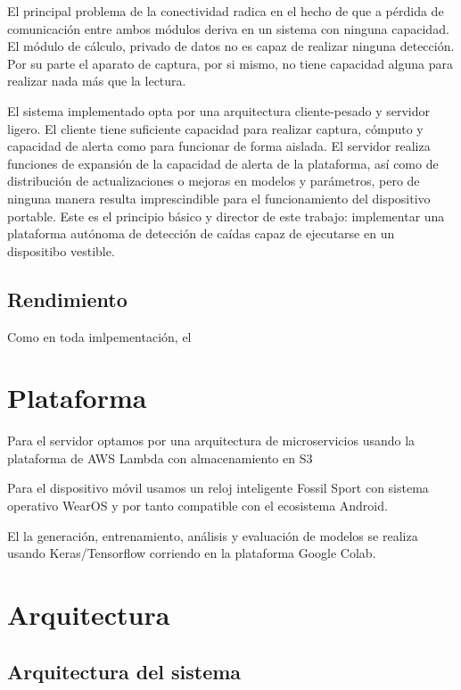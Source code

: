 El principal problema de la conectividad radica en el hecho de que a pérdida de comunicación entre ambos módulos deriva en un sistema con ninguna capacidad. El módulo de cálculo, privado de datos no es capaz de realizar ninguna detección. Por su parte el aparato de captura, por si mismo, no tiene capacidad alguna para realizar nada más que la lectura.

El sistema implementado opta por una arquitectura cliente-pesado y servidor ligero. El cliente tiene suficiente capacidad para realizar captura, cómputo y capacidad de alerta como para funcionar de forma aislada. El servidor realiza funciones de expansión de la capacidad de alerta de la plataforma, así como de distribución de actualizaciones o mejoras en modelos y parámetros, pero de ninguna manera resulta imprescindible para el funcionamiento del dispositivo portable. Este es el principio básico y director de este trabajo: implementar una plataforma autónoma de detección de caídas capaz de ejecutarse en un dispositibo vestible.

\subsection{Rendimiento}

Como en toda imlpementación, el

\section{Plataforma}
Para el servidor optamos por una arquitectura de microservicios usando la plataforma de AWS Lambda con almacenamiento en S3

Para el dispositivo móvil usamos un reloj inteligente Fossil Sport con sistema operativo WearOS y por tanto compatible con el ecosistema Android.

El la generación, entrenamiento, análisis y evaluación de modelos se realiza usando Keras/Tensorflow corriendo en la plataforma Google Colab.

\section{Arquitectura}\label{desc_archi}

\subsection{Arquitectura del sistema}

